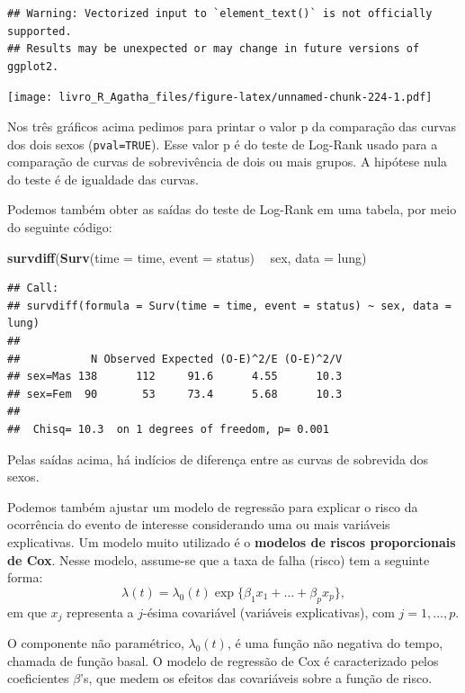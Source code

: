 \documentclass[
]{book}
\newenvironment{Shaded}{\begin{snugshade}}{\end{snugshade}}
\newcommand{\DataTypeTok}[1]{\textcolor[rgb]{0.13,0.29,0.53}{#1}}
\newcommand{\KeywordTok}[1]{\textcolor[rgb]{0.13,0.29,0.53}{\textbf{#1}}}
\newcommand{\NormalTok}[1]{#1}
\newcommand{\OperatorTok}[1]{\textcolor[rgb]{0.81,0.36,0.00}{\textbf{#1}}}
\newcommand{\StringTok}[1]{\textcolor[rgb]{0.31,0.60,0.02}{#1}}
\begin{document}
\begin{verbatim}
## Warning: Vectorized input to `element_text()` is not officially supported.
## Results may be unexpected or may change in future versions of ggplot2.
\end{verbatim}

\texttt{[image: livro\_R\_Agatha\_files/figure-latex/unnamed-chunk-224-1.pdf]}

Nos três gráficos acima pedimos para printar o valor p da comparação das curvas dos dois sexos (\texttt{pval=TRUE}). Esse valor p é do teste de Log-Rank usado para a comparação de curvas de sobrevivência de dois ou mais grupos. A hipótese nula do teste é de igualdade das curvas.

Podemos também obter as saídas do teste de Log-Rank em uma tabela, por meio do seguinte código:

\begin{Shaded}
\begin{Highlighting}[]
\KeywordTok{survdiff}\NormalTok{(}\KeywordTok{Surv}\NormalTok{(}\DataTypeTok{time =}\NormalTok{ time, }\DataTypeTok{event =}\NormalTok{ status) }\OperatorTok{~}\StringTok{ }\NormalTok{sex, }\DataTypeTok{data =}\NormalTok{ lung) }
\end{Highlighting}
\end{Shaded}

\begin{verbatim}
## Call:
## survdiff(formula = Surv(time = time, event = status) ~ sex, data = lung)
## 
##           N Observed Expected (O-E)^2/E (O-E)^2/V
## sex=Mas 138      112     91.6      4.55      10.3
## sex=Fem  90       53     73.4      5.68      10.3
## 
##  Chisq= 10.3  on 1 degrees of freedom, p= 0.001
\end{verbatim}

Pelas saídas acima, há indícios de diferença entre as curvas de sobrevida dos sexos.

Podemos também ajustar um modelo de regressão para explicar o risco da ocorrência do evento de interesse considerando uma ou mais variáveis explicativas. Um modelo muito utilizado é o \textbf{modelos de riscos proporcionais de Cox}. Nesse modelo, assume-se que a taxa de falha (risco) tem a seguinte forma:
\[
 \lambda(t) = \lambda_0(t) \exp\{\beta_1x_1 + \ldots + \beta_p x_p\},  \nonumber
 \]
em que \(x_j\) representa a \(j\)-ésima covariável (variáveis explicativas), com \(j=1,\ldots,p\).

O componente não paramétrico, \(\lambda_0(t)\), é uma função não negativa do tempo, chamada de função basal. O modelo de regressão de Cox é caracterizado pelos coeficientes \(\beta\)'s, que medem os efeitos das covariáveis sobre a função de risco.
\end{document}

